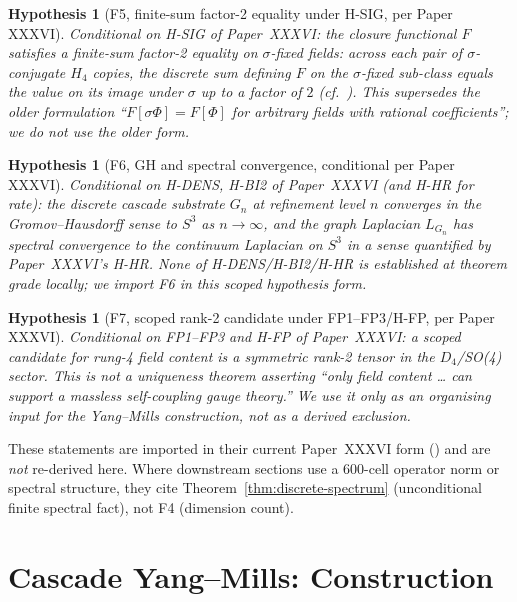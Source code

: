 \documentclass[11pt, a4paper]{amsart}
\newtheorem{hypothesis}[theorem]{Hypothesis}
\theoremstyle{definition}
\begin{document}
\begin{hypothesis}[F5, finite-sum factor-2 equality under H-SIG, per Paper XXXVI]\label{thm:F5}
\emph{Conditional on H-SIG of Paper~XXXVI:} the closure functional
$F$ satisfies a finite-sum factor-2 equality
on $\sigma$-fixed fields: across each pair of $\sigma$-conjugate
$H_4$ copies, the discrete sum defining $F$ on the $\sigma$-fixed
sub-class equals the value on its image under $\sigma$ up to a
factor of $2$ (cf.\ \cite[lines 539--562]{cascadeFoundations}).
This \emph{supersedes} the older formulation
``$F[\sigma\Phi] = F[\Phi]$ for arbitrary fields with rational
coefficients''; we do not use the older form.
\end{hypothesis}

\begin{hypothesis}[F6, GH and spectral convergence, conditional per Paper XXXVI]\label{thm:F6}
\emph{Conditional on H-DENS, H-BI2 of Paper~XXXVI (and H-HR for
rate):} the discrete cascade substrate $G_n$ at refinement level
$n$ converges in the Gromov--Hausdorff sense to $S^3$ as
$n \to \infty$, and the graph Laplacian $L_{G_n}$ has spectral
convergence to the continuum Laplacian on $S^3$ in a sense
quantified by Paper~XXXVI's H-HR. None of H-DENS/H-BI2/H-HR is
established at theorem grade locally; we import F6 in this scoped
hypothesis form.
\end{hypothesis}

\begin{hypothesis}[F7, scoped rank-2 candidate under FP1--FP3/H-FP, per Paper XXXVI]\label{thm:F7}
\emph{Conditional on FP1--FP3 and H-FP of Paper~XXXVI:} a scoped
candidate for rung-4 field content is a symmetric rank-2 tensor
in the $D_4$/SO(4) sector. This is \emph{not} a uniqueness theorem
asserting ``only field content … can support a massless
self-coupling gauge theory.'' We use it only as an organising
input for the Yang--Mills construction, not as a derived
exclusion.
\end{hypothesis}

These statements are imported in their current Paper~XXXVI form
(\cite[F2/F4/F5/F6/F7]{cascadeFoundations}) and are \emph{not}
re-derived here. Where downstream sections use a 600-cell operator
norm or spectral structure, they cite Theorem~\ref{thm:discrete-spectrum}
(unconditional finite spectral fact), not F4 (dimension count).

\section{Cascade Yang--Mills: Construction}
\end{document}
